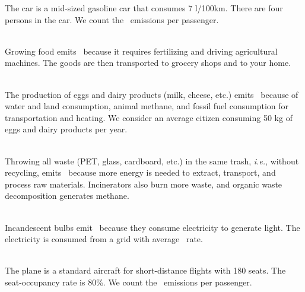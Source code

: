 \begin{enumerateb}
	The car is a mid-sized gasoline car that consumes 7 l/100km.
	There are four persons in the car.
	We count the \COtwo\ emissions per passenger. \\
	\item {} \\
	Growing food emits \COtwo\ because it requires fertilizing and driving agricultural machines.
	The goods are then transported to grocery shops and to your home. \\
	\item {} \\
	The production of eggs and dairy products (milk, cheese, etc.) emits \COtwo\ because of water and land consumption, animal methane, and fossil fuel consumption for transportation and heating.
	We consider an average citizen consuming 50 kg of eggs and dairy products per year. \\
	\item {} \\
	Throwing all waste (PET, glass, cardboard, etc.) in the same trash, \textit{i.e.}, without recycling, emits \COtwo\ because more energy is needed to extract, transport, and process raw materials.
	Incinerators also burn more waste, and organic waste decomposition generates methane. \\
	\item {} \\
	Incandescent bulbs emit \COtwo\ because they consume electricity to generate light.
	The electricity is consumed from a grid with average \COtwo\ rate. \\
	\item {} \\
	The plane is a standard aircraft for short-distance flights with 180 seats.
	The seat-occupancy rate is 80\%.
	We count the \COtwo\ emissions per passenger. \\
	\item {} \\

\end{enumerateb}
